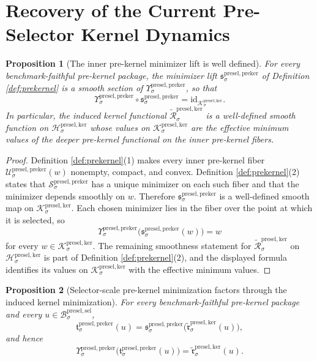 \documentclass[11pt]{article}
\newcommand{\PreSectionSelectorBody}[1]{\mathcal B_{#1}^{\mathrm{presel,sel}}}
\newcommand{\KernelSpace}[1]{\mathcal H_{#1}^{\mathrm{presel,ker}}}
\newcommand{\KernelBody}[1]{\mathcal K_{#1}^{\mathrm{presel,ker}}}
\newcommand{\PreKernelProj}[1]{\Upsilon_{#1}^{\mathrm{presel,preker}}}
\newcommand{\PreKernelFiber}[2]{\mathcal U_{#1}^{\mathrm{presel,preker}}(#2)}
\newcommand{\PreKernelFunctional}[1]{\mathscr S_{#1}^{\mathrm{presel,preker}}}
\newcommand{\PreKernelMinLift}[1]{\mathfrak s_{#1}^{\mathrm{presel,preker}}}
\newcommand{\PreKernelComposedMin}[1]{\mathfrak t_{#1}^{\mathrm{presel,preker}}}
\newcommand{\InducedKernelFunctional}[1]{\widetilde{\mathscr R}_{#1}^{\mathrm{presel,ker}}}
\newcommand{\InducedKernelMinLift}[1]{\widetilde{\mathfrak r}_{#1}^{\mathrm{presel,ker}}}
\newtheorem{proposition}{Proposition}
\begin{document}
\section{Recovery of the Current Pre-Selector Kernel Dynamics}

\begin{proposition}[The inner pre-kernel minimizer lift is well defined]
\label{prop:inner}
For every benchmark-faithful pre-kernel package, the minimizer lift \(\PreKernelMinLift{\sigma}\) of Definition \ref{def:prekernel} is a smooth section of \(\PreKernelProj{\sigma}\), so that
\[
\PreKernelProj{\sigma}\circ\PreKernelMinLift{\sigma}
=
\mathrm{id}_{\KernelBody{\sigma}}.
\]
In particular, the induced kernel functional \(\InducedKernelFunctional{\sigma}\) is a well-defined smooth function on \(\KernelSpace{\sigma}\) whose values on \(\KernelBody{\sigma}\) are the effective minimum values of the deeper pre-kernel functional on the inner pre-kernel fibers.
\end{proposition}

\begin{proof}
Definition \ref{def:prekernel}(1) makes every inner pre-kernel fiber \(\PreKernelFiber{\sigma}{w}\) nonempty, compact, and convex. Definition \ref{def:prekernel}(2) states that \(\PreKernelFunctional{\sigma}\) has a unique minimizer on each such fiber and that the minimizer depends smoothly on \(w\). Therefore \(\PreKernelMinLift{\sigma}\) is a well-defined smooth map on \(\KernelBody{\sigma}\). Each chosen minimizer lies in the fiber over the point at which it is selected, so
\[
\PreKernelProj{\sigma}\bigl(\PreKernelMinLift{\sigma}(w)\bigr)=w
\]
for every \(w\in\KernelBody{\sigma}\). The remaining smoothness statement for \(\InducedKernelFunctional{\sigma}\) on \(\KernelSpace{\sigma}\) is part of Definition \ref{def:prekernel}(2), and the displayed formula identifies its values on \(\KernelBody{\sigma}\) with the effective minimum values.
\end{proof}

\begin{proposition}[Selector-scale pre-kernel minimization factors through the induced kernel minimization]
\label{prop:selectorfactor}
For every benchmark-faithful pre-kernel package and every \(u\in\PreSectionSelectorBody{\sigma}\),
\[
\PreKernelComposedMin{\sigma}(u)
=
\PreKernelMinLift{\sigma}\bigl(\InducedKernelMinLift{\sigma}(u)\bigr),
\]
and hence
\[
\PreKernelProj{\sigma}\bigl(\PreKernelComposedMin{\sigma}(u)\bigr)
=
\InducedKernelMinLift{\sigma}(u).
\]
\end{proposition}
\end{document}
